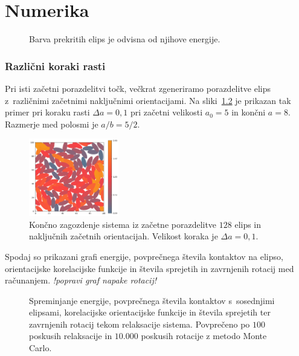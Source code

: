 \chapter{Numerika}
\begin{figure}[!ht]
    \centering
    \resizebox{.6\textwidth}{!}{}
    \caption{Barva prekritih elips je odvisna od njihove energije.}
    \label{fig:energija}
\end{figure}
\subsection{Različni koraki rasti}
Pri isti začetni porazdelitvi točk, večkrat zgeneriramo porazdelitve elips z~različnimi
začetnimi naključnimi orientacijami. Na sliki~\ref{fig:delta_a_01} je prikazan tak primer
pri koraku rasti $\Delta a = 0,1$ pri začetni velikosti $a_0 = 5$ in končni $a = 8$. 
Razmerje med polosmi je $a/b = 5/2$.
\begin{figure}[!ht]
    \centering
    \includegraphics[width=0.35\textwidth]{./figures/runs/delta_a_01/run01}
    \caption{Končno zagozdenje sistema iz začetne porazdelitve $128$ elips in 
    naključnih začetnih orientacijah. Velikost koraka je $\Delta a = 0,1$.}
    \label{fig:delta_a_01}
\end{figure}
Spodaj so prikazani grafi energije, povprečnega števila kontaktov na elipso, orientacijske
korelacijske funkcije in števila sprejetih in zavrnjenih rotacij med računanjem. 
\emph{!popravi graf napake rotacij!}
\begin{figure}
    \centering
    \resizebox{.48\textwidth}{!}{}
    \resizebox{.48\textwidth}{!}{}
    \resizebox{.48\textwidth}{!}{}
    \resizebox{.48\textwidth}{!}{}
    \resizebox{.48\textwidth}{!}{}
    \resizebox{.48\textwidth}{!}{}
    \resizebox{.48\textwidth}{!}{}
    \resizebox{.48\textwidth}{!}{}
    \caption{Spreminjanje energije, povprečnega števila kontaktov s~sosednjimi elipsami,
    korelacijske orientacijske funkcije in števila sprejetih ter zavrnjenih rotacij tekom
    relaksacije sistema. Povprečeno po $100$ poskusih relaksacije in $10.000$ poskusih 
    rotacije z metodo Monte Carlo.}
    \label{fig:average_a_01}
\end{figure}